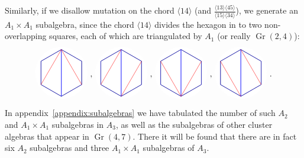 \documentclass[12pt]{article}
\DeclareMathOperator{\Gr}{Gr}
\def\ket#1{\langle #1 \rangle}
\def\drawHexagon{
\coordinate (P1) at (90:1);
\coordinate (P2) at (30:1);
\coordinate (P3) at (330:1);
\coordinate (P4) at (270:1);
\coordinate (P5) at (210:1);
\coordinate (P6) at (150:1);
\draw[white,fill=white] (0,0) circle (1.1cm);
\draw (P1) -- (P2) -- (P3) -- (P4) -- (P5) -- (P6) -- cycle;
}
\begin{document}
Similarly, if we disallow mutation on the chord $\ket{14}$ (and $\frac{\ket{13}\ket{45}}{\ket{15}\ket{34}}$), we generate an $A_1 \times A_1$ subalgebra, since the chord $\ket{14}$ divides the hexagon in to two non-overlapping squares, each of which are triangulated by $A_1$ (or really $\Gr(2,4)$):
\begin{equation}
\begin{gathered}
\begin{tikzpicture}
	\drawHexagon
  	\draw[color=blue] (P1) -- (P2) -- (P3) -- (P4) -- cycle;
  	\draw[color=blue] (P1) -- (P4) -- (P5) -- (P6) -- cycle;
  	\draw[color=red] (P1) -- (P5);
  	\draw[color=red] (P1) -- (P3); 
\end{tikzpicture} 
\end{gathered}
{\ ,\ }
\begin{gathered}
\begin{tikzpicture}
  	\begin{scope}[xshift=2cm]
	\drawHexagon
  	\draw[color=blue] (P1) -- (P2) -- (P3) -- (P4) -- cycle;
  	\draw[color=blue] (P1) -- (P4) -- (P5) -- (P6) -- cycle;
  	\draw[color=red] (P1) -- (P5);
  	\draw[color=red] (P4) -- (P2);
	\end{scope}
\end{tikzpicture} 
\end{gathered}
{\ ,\ }
\begin{gathered}
\begin{tikzpicture}
	\begin{scope}[xshift=4cm]
	\drawHexagon
  	\draw[color=blue] (P1) -- (P2) -- (P3) -- (P4) -- cycle;
  	\draw[color=blue] (P1) -- (P4) -- (P5) -- (P6) -- cycle;
  	\draw[color=red] (P6) -- (P4);
  	\draw[color=red] (P4) -- (P2);
	\end{scope}
\end{tikzpicture} 
\end{gathered}
{\ ,\ }
\begin{gathered}
\begin{tikzpicture}
	\begin{scope}[xshift=6cm]
	\drawHexagon
  	\draw[color=blue] (P1) -- (P2) -- (P3) -- (P4) -- cycle;
  	\draw[color=blue] (P1) -- (P4) -- (P5) -- (P6) -- cycle;
  	\draw[color=red] (P6) -- (P4);
  	\draw[color=red] (P1) -- (P3);
	\end{scope}
\end{tikzpicture}
\end{gathered} \ .
\end{equation}
In appendix~\ref{appendix:subalgebras} we have tabulated the number of such $A_2$ and $A_1 \times A_1$ subalgebras in $A_3$, as well as the subalgebras of other cluster algebras that appear in $\Gr(4,7)$. There it will be found that there are in fact six $A_2$ subalgebras and three $A_1 \times A_1$ subalgebras of $A_3$.
\end{document}

